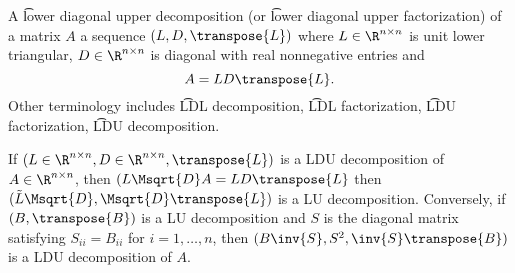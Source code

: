 A \t{lower diagonal upper decomposition} (or \t{lower diagonal upper factorization}) of a matrix $A$ a sequence $(L, D, \transpose{L})$ where $L \in \R^{n \times n}$ is unit lower triangular, $D \in \R^{n \times n}$ is diagonal with real nonnegative entries and
\[
  A = LD\transpose{L}.
\]
Other terminology includes \t{LDL decomposition}, \t{LDL factorization}, \t{LDU factorization}, \t{LDU decomposition}.

If $(L \in \R^{n \times n}, D \in \R^{n \times n}, \transpose{L})$ is a LDU decomposition of $A \in \R^{n \times n}$, then $(L\Msqrt{D}A = LD\transpose{L}$ then $(\tilde{L}\Msqrt{D}, \Msqrt{D}\transpose{L})$ is a LU decomposition.
Conversely, if $(B, \transpose{B})$ is a LU decomposition and $S$ is the diagonal matrix satisfying $S_{ii} = B_{ii}$ for $i = 1, \dots, n$, then $(B\inv{S}, S^2, \inv{S}\transpose{B})$ is a LDU decomposition of $A$.

\blankpage
